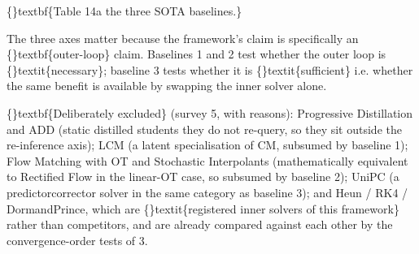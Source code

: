 \documentclass{article}
\begin{document}
\{\}textbf\{Table 14a  the three SOTA baselines.\}

\begin{table}[ht]
\centering
\small
{}
\end{table}

The three axes matter because the framework's claim is specifically an \{\}textbf\{outer-loop\} claim. Baselines 1 and 2 test whether the outer loop is \{\}textit\{necessary\}; baseline 3 tests whether it is \{\}textit\{sufficient\}  i.e. whether the same benefit is available by swapping the inner solver alone.

\{\}textbf\{Deliberately excluded\} (survey 5, with reasons): Progressive Distillation and ADD (static distilled students  they do not re-query, so they sit outside the re-inference axis); LCM (a latent specialisation of CM, subsumed by baseline 1); Flow Matching with OT and Stochastic Interpolants (mathematically equivalent to Rectified Flow in the linear-OT case, so subsumed by baseline 2); UniPC (a predictorcorrector solver in the same category as baseline 3); and Heun / RK4 / DormandPrince, which are \{\}textit\{registered inner solvers of this framework\} rather than competitors, and are already compared against each other by the convergence-order tests of 3.
\end{document}
